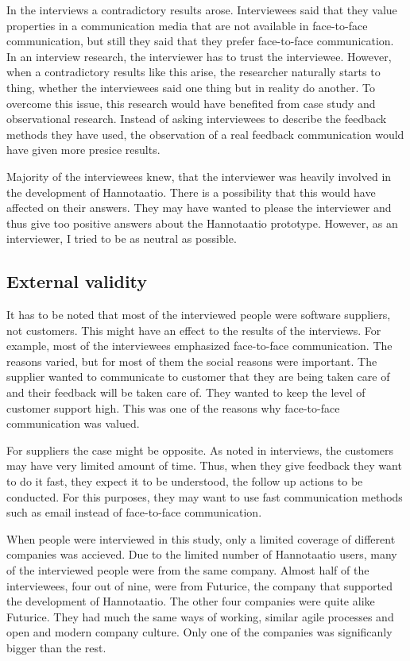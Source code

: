 \documentclass[english,12pt,a4paper,pdftex]{article}
\begin{document}
In the interviews a contradictory results arose. Interviewees said that they value properties in a communication media that are not available in face-to-face communication, but still they said that they prefer face-to-face communication. In an interview research, the interviewer has to trust the interviewee. However, when a contradictory results like this arise, the researcher naturally starts to thing, whether the interviewees said one thing but in reality do another. To overcome this issue, this research would have benefited from case study and observational research. Instead of asking interviewees to describe the feedback methods they have used, the observation of a real feedback communication would have given more presice results.

Majority of the interviewees knew, that the interviewer was heavily involved in the development of Hannotaatio. There is a possibility that this would have affected on their answers. They may have wanted to please the interviewer and thus give too positive answers about the Hannotaatio prototype. However, as an interviewer, I tried to be as neutral as possible.

\subsection{External validity}

It has to be noted that most of the interviewed people were software suppliers, not customers. This might have an effect to the results of the interviews. For example, most of the interviewees emphasized face-to-face communication. The reasons varied, but for most of them the social reasons were important. The supplier wanted to communicate to customer that they are being taken care of and their feedback will be taken care of. They wanted to keep the level of customer support high. This was one of the reasons why face-to-face communication was valued. 

For suppliers the case might be opposite. As noted in interviews, the customers may have very limited amount of time. Thus, when they give feedback they want to do it fast, they expect it to be understood, the follow up actions to be conducted. For this purposes, they may want to use fast communication methods such as email instead of face-to-face communication.

When people were interviewed in this study, only a limited coverage of different companies was accieved. Due to the limited number of Hannotaatio users, many of the interviewed people were from the same company. Almost half of the interviewees, four out of nine, were from Futurice, the company that supported the development of Hannotaatio. The other four companies were quite alike Futurice. They had much the same ways of working, similar agile processes and open and modern company culture. Only one of the companies was significanly bigger than the rest.
\end{document}
